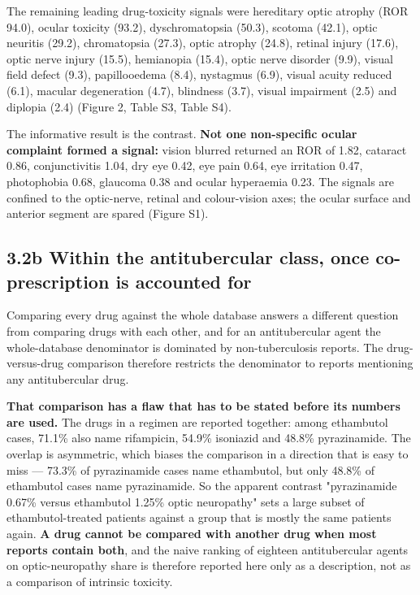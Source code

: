 \documentclass[utf8]{FrontiersinVancouver}
\begin{document}
The remaining leading drug-toxicity signals were hereditary optic atrophy (ROR 94.0), ocular toxicity (93.2), dyschromatopsia (50.3), scotoma (42.1), optic neuritis (29.2), chromatopsia (27.3), optic atrophy (24.8), retinal injury (17.6), optic nerve injury (15.5), hemianopia (15.4), optic nerve disorder (9.9), visual field defect (9.3), papillooedema (8.4), nystagmus (6.9), visual acuity reduced (6.1), macular degeneration (4.7), blindness (3.7), visual impairment (2.5) and diplopia (2.4) (Figure 2, Table S3, Table S4).

The informative result is the contrast. \textbf{Not one non-specific ocular complaint formed a signal:} vision blurred returned an ROR of 1.82, cataract 0.86, conjunctivitis 1.04, dry eye 0.42, eye pain 0.64, eye irritation 0.47, photophobia 0.68, glaucoma 0.38 and ocular hyperaemia 0.23. The signals are confined to the optic-nerve, retinal and colour-vision axes; the ocular surface and anterior segment are spared (Figure S1).

\subsection{3.2b Within the antitubercular class, once co-prescription is accounted for}

Comparing every drug against the whole database answers a different question from comparing drugs with each other, and for an antitubercular agent the whole-database denominator is dominated by non-tuberculosis reports. The drug-versus-drug comparison therefore restricts the denominator to reports mentioning any antitubercular drug.

\textbf{That comparison has a flaw that has to be stated before its numbers are used.} The drugs in a regimen are reported together: among ethambutol cases, 71.1\% also name rifampicin, 54.9\% isoniazid and 48.8\% pyrazinamide. The overlap is asymmetric, which biases the comparison in a direction that is easy to miss --- 73.3\% of pyrazinamide cases name ethambutol, but only 48.8\% of ethambutol cases name pyrazinamide. So the apparent contrast "pyrazinamide 0.67\% versus ethambutol 1.25\% optic neuropathy" sets a large subset of ethambutol-treated patients against a group that is mostly the same patients again. \textbf{A drug cannot be compared with another drug when most reports contain both}, and the naive ranking of eighteen antitubercular agents on optic-neuropathy share is therefore reported here only as a description, not as a comparison of intrinsic toxicity.
\end{document}
